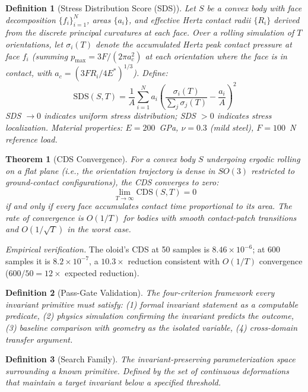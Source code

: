 \documentclass[11pt,a4paper]{article}
\newtheorem{definition}{Definition}
\newtheorem{theorem}{Theorem}
\begin{document}
\begin{definition}[Stress Distribution Score (SDS)]
\label{def:sds}
Let $S$ be a convex body with face decomposition $\{f_i\}_{i=1}^N$,
areas $\{a_i\}$, and effective Hertz contact radii $\{R_i\}$ derived
from the discrete principal curvatures at each face. Over a rolling
simulation of $T$ orientations, let $\sigma_i(T)$ denote the accumulated
Hertz peak contact pressure at face $f_i$ (summing
$p_{\max} = 3F/(2\pi a_c^2)$ at each orientation where the face is in
contact, with $a_c = (3FR_i/4E^*)^{1/3}$). Define:
\begin{equation}
  \mathrm{SDS}(S, T) = \frac{1}{A} \sum_{i=1}^{N} a_i
    \left(\frac{\sigma_i(T)}{\sum_j \sigma_j(T)} - \frac{a_i}{A}\right)^2
\end{equation}
SDS $\to 0$ indicates uniform stress distribution; SDS $> 0$ indicates
stress localization. Material properties: $E = 200$~GPa, $\nu = 0.3$
(mild steel), $F = 100$~N reference load.
\end{definition}

\begin{theorem}[CDS Convergence]
\label{thm:convergence}
For a convex body $S$ undergoing ergodic rolling on a flat plane
(i.e., the orientation trajectory is dense in $SO(3)$ restricted to
ground-contact configurations), the CDS converges to zero:
\begin{equation}
  \lim_{T \to \infty} \mathrm{CDS}(S, T) = 0
\end{equation}
if and only if every face accumulates contact time proportional to its
area. The rate of convergence is $O(1/T)$ for bodies with smooth
contact-patch transitions and $O(1/\sqrt{T})$ in the worst case.
\end{theorem}

\noindent\textit{Empirical verification.} The oloid's CDS at 50 samples
is $8.46 \times 10^{-6}$; at 600 samples it is $8.2 \times 10^{-7}$,
a $10.3\times$ reduction consistent with $O(1/T)$ convergence
($600/50 = 12\times$ expected reduction).

\begin{definition}[Pass-Gate Validation]
The four-criterion framework every invariant primitive must satisfy:
(1) formal invariant statement as a computable predicate,
(2) physics simulation confirming the invariant predicts the outcome,
(3) baseline comparison with geometry as the isolated variable,
(4) cross-domain transfer argument.
\end{definition}

\begin{definition}[Search Family]
The invariant-preserving parameterization space surrounding a known
primitive. Defined by the set of continuous deformations that maintain
a target invariant below a specified threshold.
\end{definition}
\end{document}
